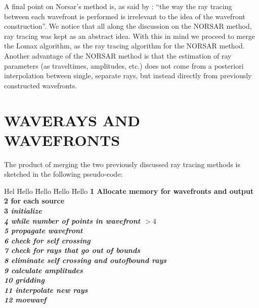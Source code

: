A final point on Norsar's method is, as said by \cite{Vinje}:
``the way the ray tracing between each wavefront is performed
is irrelevant to the idea of the wavefront construction''.
We notice that all along the discussion on the NORSAR method,
ray tracing was kept as an abstract idea. With this in mind
we proceed to merge the Lomax algorithm, as the ray tracing 
algorithm for the NORSAR method. Another advantage of the
NORSAR method is that the estimation of ray parameters (as
traveltimes, amplitudes, etc.) does not come from a 
posteriori interpolation between single, separate rays,
but instead directly from previously constructed wavefronts.




\section{WAVERAYS AND WAVEFRONTS}

The product of merging the two previously discussed ray tracing methods
is sketched in the following pseudo-code:

\begin{tabbing}
Hel \= Hello \= Hello \= Hello \= Hello \kill
\bf 1 \> Allocate memory for wavefronts and output \\
\bf 2 \> for each source \\
\bf 3 \> \> \em initialize  \\
\bf 4 \> \> while number of points in wavefront $> 4$ \\
\bf 5 \> \> \> \em propagate wavefront \\
\bf 6 \> \> \> \em check for self crossing \\
\bf 7 \> \> \> \em check for rays that go out of bounds \\
\bf 8 \> \> \> \em eliminate self crossing and outofbound rays \\
\bf 9 \> \> \> \em calculate amplitudes \\
\bf 10 \> \> \> \em gridding \\
\bf 11 \> \> \> \em interpolate new rays \\
\bf 12 \> \> \> \em movwavf
\end{tabbing}

